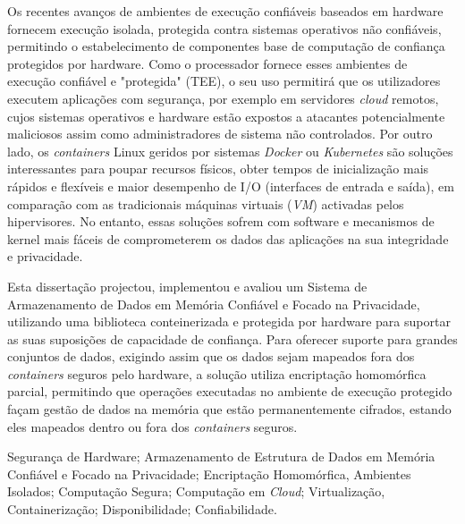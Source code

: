 Os recentes avanços de ambientes de execução confiáveis baseados em hardware fornecem execução isolada, protegida contra sistemas operativos não confiáveis, permitindo o estabelecimento de componentes base de computação de confiança protegidos por hardware. Como o processador fornece esses ambientes de execução confiável e "protegida" (TEE), o seu uso permitirá que os utilizadores executem aplicações com segurança, por exemplo em servidores \textit{cloud} remotos, cujos sistemas operativos e hardware estão expostos a atacantes potencialmente maliciosos assim como administradores de sistema não controlados.
Por outro lado, os \textit{containers} Linux geridos por sistemas \textit{Docker} ou \textit{Kubernetes} são soluções interessantes para poupar recursos físicos, obter tempos de inicialização mais rápidos e flexíveis e maior desempenho de I/O (interfaces de entrada e saída), em comparação com as tradicionais máquinas virtuais (\textit{VM}) activadas pelos hipervisores. No entanto, essas soluções sofrem com software e mecanismos de kernel mais fáceis de comprometerem os dados das aplicações na sua integridade e privacidade.

Esta dissertação projectou, implementou e avaliou um Sistema de  Armazenamento de Dados em Memória Confiável e Focado na Privacidade, utilizando uma biblioteca conteinerizada e protegida por hardware para suportar as suas suposições de capacidade de confiança. Para oferecer suporte para grandes conjuntos de dados, exigindo assim que os dados sejam mapeados fora dos \textit{containers} seguros pelo hardware, a solução utiliza encriptação homomórfica parcial, permitindo que operações executadas no ambiente de execução protegido façam gestão de dados na memória que estão permanentemente cifrados, estando eles mapeados dentro ou fora dos \textit{containers} seguros.

\begin{keywords}
Segurança de Hardware; Armazenamento de Estrutura de Dados em Memória Confiável e Focado na Privacidade; Encriptação Homomórfica, Ambientes Isolados; Computação Segura; Computação em \textit{Cloud}; Virtualização, Containerização; Disponibilidade; Confiabilidade.
\end{keywords} 
